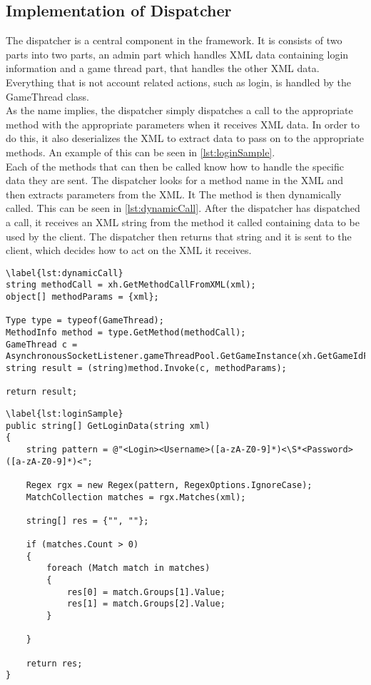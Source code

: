 \subsection{Implementation of Dispatcher}
\label{chap:dispImplementation}
The dispatcher is a central component in the framework. It is consists of two parts into two parts, an admin part which handles XML data containing login information and a game thread part, that handles the other XML data. Everything that is not account related actions, such as login, is handled by the GameThread class.\\

 As the name implies, the dispatcher simply dispatches a call to the appropriate method with the appropriate parameters when it receives XML data. In order to do this, it also deserializes the XML to extract data to pass on to the appropriate methods. An example of this can be seen in \cref{lst:loginSample}.\\
 
 Each of the methods that can then be called know how to handle the specific data they are sent. The dispatcher looks for a method name in the XML and then extracts parameters from the XML. It The method is then dynamically called. This can be seen in \cref{lst:dynamicCall}. After the dispatcher has dispatched a call, it receives an XML string from the method it called containing data to be used by the client. The dispatcher then returns that string and it is sent to the client, which decides how to act on the XML it receives.

\begin{lstlisting}
\label{lst:dynamicCall}
string methodCall = xh.GetMethodCallFromXML(xml);
object[] methodParams = {xml};

Type type = typeof(GameThread);
MethodInfo method = type.GetMethod(methodCall);
GameThread c = AsynchronousSocketListener.gameThreadPool.GetGameInstance(xh.GetGameIdFromXML(xml));
string result = (string)method.Invoke(c, methodParams);

return result;
\end{lstlisting}

\begin{lstlisting}
\label{lst:loginSample}
public string[] GetLoginData(string xml) 
{
    string pattern = @"<Login><Username>([a-zA-Z0-9]*)<\S*<Password>([a-zA-Z0-9]*)<";

    Regex rgx = new Regex(pattern, RegexOptions.IgnoreCase);
    MatchCollection matches = rgx.Matches(xml);

    string[] res = {"", ""};

    if (matches.Count > 0)
    {
        foreach (Match match in matches)
        {
            res[0] = match.Groups[1].Value;
            res[1] = match.Groups[2].Value;
        }
            
    }

    return res;
}
\end{lstlisting}